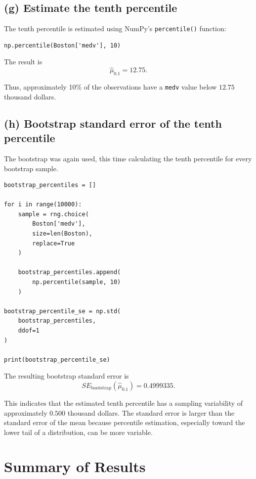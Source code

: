 \documentclass[12pt,a4paper]{article}
\begin{document}
\subsection*{(g) Estimate the tenth percentile}

The tenth percentile is estimated using NumPy's
\texttt{percentile()} function:

\begin{lstlisting}
np.percentile(Boston['medv'], 10)
\end{lstlisting}

The result is
\[
\boxed{\hat{\mu}_{0.1}=12.75}.
\]

Thus, approximately 10\% of the observations have a \texttt{medv} value
below $12.75$ thousand dollars.

\subsection*{(h) Bootstrap standard error of the tenth percentile}

The bootstrap was again used, this time calculating the tenth percentile
for every bootstrap sample.

\begin{lstlisting}
bootstrap_percentiles = []

for i in range(10000):
    sample = rng.choice(
        Boston['medv'],
        size=len(Boston),
        replace=True
    )

    bootstrap_percentiles.append(
        np.percentile(sample, 10)
    )

bootstrap_percentile_se = np.std(
    bootstrap_percentiles,
    ddof=1
)

print(bootstrap_percentile_se)
\end{lstlisting}

The resulting bootstrap standard error is
\[
\boxed{SE_{\text{bootstrap}}(\hat{\mu}_{0.1})=0.4999335}.
\]

This indicates that the estimated tenth percentile has a sampling
variability of approximately $0.500$ thousand dollars. The standard
error is larger than the standard error of the mean because percentile
estimation, especially toward the lower tail of a distribution, can be
more variable.

\section{Summary of Results}
\end{document}
